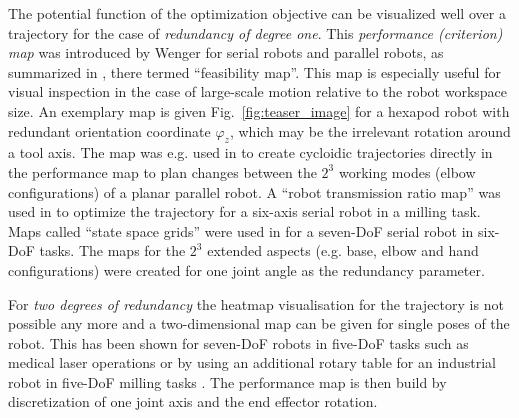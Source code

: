 \documentclass[runningheads]{llncs}
\begin{document}
The potential function of the optimization objective can be visualized well over a trajectory for the case of \emph{redundancy of degree one}.
This \emph{performance (criterion) map} was introduced by Wenger for serial robots and parallel robots, as summarized in \cite{RevelesWenoth2016}, there termed ``feasibility map''.
This map is especially useful for visual inspection in the case of large-scale motion relative to the robot workspace size.
An exemplary map is given Fig.~\ref{fig:teaser_image} for a hexapod robot with redundant orientation coordinate $\varphi_z$, which may be the irrelevant rotation around a tool axis.
The map was e.g. used in \cite{RevelesWenoth2016} to create cycloidic trajectories directly in the performance map to plan changes between the $2^3$ working modes (elbow configurations) of a planar parallel robot.
A ``robot transmission ratio map'' was used in \cite{ZargarbashiKhaAng2012} to optimize the trajectory for a six-axis serial robot in a milling task.
Maps called ``state space grids'' were used in \cite{FerrentinoSalChi2021} for a seven-DoF serial robot in six-DoF tasks.
The maps for the $2^3$ extended aspects (e.g. base, elbow and hand configurations) were created for one joint angle as the redundancy parameter.

For \emph{two degrees of redundancy} the heatmap visualisation for the trajectory is not possible any more and a two-dimensional map can be given for single poses of the robot.
This has been shown for seven-DoF robots in five-DoF tasks such as medical laser operations \cite{Schappler2013_B371} or by using an additional rotary table for an industrial robot in five-DoF milling tasks \cite{MousaviGagBouRay2017}.
The performance map is then build by discretization of one joint axis and the end effector rotation.
\end{document}
